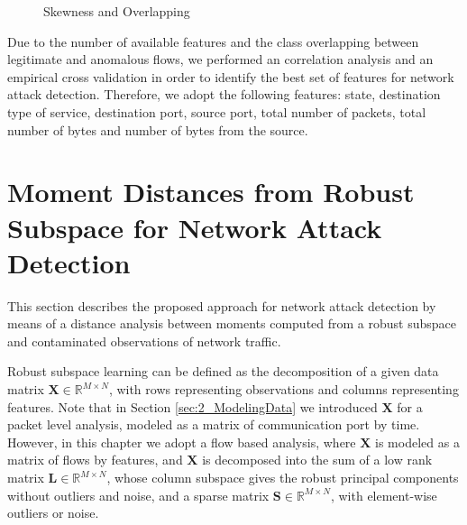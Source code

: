\begin{figure}[!htb]
	\centering
	\caption[Skewness and Overlapping]{Skewness and Overlapping}
	\label{fig:4.10}
\end{figure}

Due to the number of available features and the class overlapping between legitimate and anomalous flows, we performed an correlation analysis and an empirical cross validation in order to identify the best set of features for network attack detection. Therefore, we adopt the following features: state, destination type of service, destination port, source port, total number of packets, total number of bytes and number of bytes from the source.


\section{Moment Distances from Robust Subspace for Network Attack Detection}
\label{sec:3_proposal}

This section describes the proposed approach for network attack detection by means of a distance analysis between moments computed from a robust subspace and contaminated observations of network traffic. 

Robust subspace learning can be defined as the decomposition of a given data matrix $\pmb{X} \in \mathbb{R}^{M \times N}$, with rows representing observations and columns representing features. Note that in Section \ref{sec:2_ModelingData} we introduced $\pmb{X}$ for a packet level analysis, modeled as a matrix of communication port by time. However, in this chapter we adopt a flow based analysis, where $\pmb{X}$ is modeled as a matrix of flows by features, and $\pmb{X}$ is decomposed into the sum of a low rank matrix $\pmb{L} \in \mathbb{R}^{M \times N}$, whose column subspace gives the robust principal components without outliers and noise, and a sparse matrix $\pmb{S} \in \mathbb{R}^{M \times N}$, with element-wise outliers or noise.

